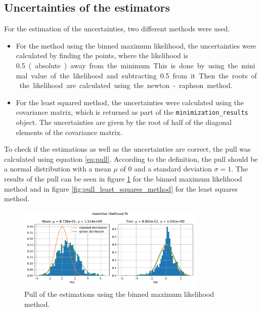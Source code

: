 \documentclass[11pt, a4paper, oneside]{book}
\newcommand\Plotwidth{0.8}
\begin{document}
\subsection{Uncertainties of the estimators}
For the estimation of the uncertainties, two different methods were used. 
\begin{itemize}
    \item For the method using the binned maximum likelihood, the uncertainties were calculated by finding the points, where the likelihood is \qty{0.5} (absolute) away from the minimum. This is done by using the minimal value of the likelihood and subtracting \qty{0.5} from it. Then the roots of the likelihood are calculated using the newton-raphson method. 
    \item For the least squared method, the uncertainties were calculated using the covariance matrix, which is returned as part of the \lstinline{minimization_results} object. The uncertainties are given by the root of half of the diagonal elements of the covariance matrix.
\end{itemize}

To check if the estimations as well as the uncertainties are correct, the pull was calculated using equation \ref{eq:pull}. According to the definition, the pull should be a normal distribution with a mean $\mu$ of 0 and a standard deviation $\sigma = 1$. The results of the pull can be seen in figure \ref{fig:pull_likelihood_method} for the binned maximum likelihood method and in figure \ref{fig:pull_least_squares_method} for the least squares method. 

\begin{figure}[H]
  \centering
  \includegraphics[width=\Plotwidth\textwidth]{images/estimators_pull_likelihood.pdf}
  \caption{Pull of the estimations using the binned maximum likelihood method.}
  \label{fig:pull_likelihood_method}
\end{figure}
\end{document}
